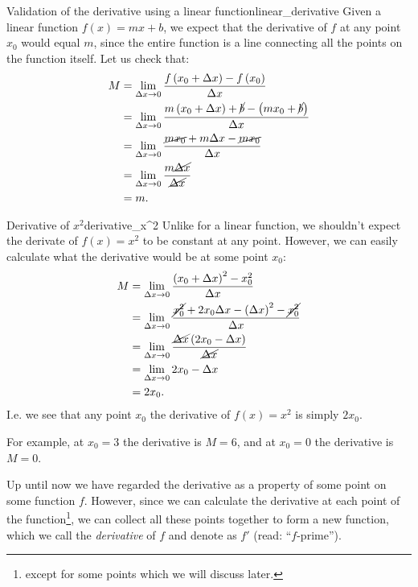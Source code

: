 \begin{example}{Validation of the derivative using a linear function}{linear_derivative}
  Given a linear function $f(x)=mx+b$, we expect that the derivative of $f$ at any point $x_{0}$ would equal $m$, since the entire function is a line connecting all the points on the function itself. Let us check that:
  \begin{align*}
    M &= \lim\limits_{\Delta x\to 0}\frac{f\left(x_{0}+\Delta x\right)-f\left(x_{0}\right)}{\Delta x}\\
      &= \lim\limits_{\Delta x\to 0}\frac{m\left(x_{0}+\Delta x\right)+\cancel{b}-\left(mx_{0}+\cancel{b}\right)}{\Delta x}\\
      &= \lim\limits_{\Delta x\to 0}\frac{\cancel{mx_{0}}+m\Delta x-\cancel{mx_{0}}}{\Delta x}\\
      &= \lim\limits_{\Delta x\to 0}\frac{m\cancel{\Delta x}}{\cancel{\Delta x}}\\
      &= m.
  \end{align*}
\end{example}

\begin{example}{Derivative of $x^{2}$}{derivative_x^2}
  Unlike for a linear function, we shouldn't expect the derivate of $f(x)=x^{2}$ to be constant at any point. However, we can easily calculate what the derivative would be at some point $x_{0}$:
  \begin{align*}
    M &= \lim\limits_{\Delta x\to 0}\frac{\left(x_{0}+\Delta x\right)^{2}-x_{0}^{2}}{\Delta x}\\
      &= \lim\limits_{\Delta x\to 0}\frac{\cancel{x_{0}^{2}}+2x_{0}\Delta x-\left(\Delta x\right)^{2}-\cancel{x_{0}^{2}}}{\Delta x}\\
      &= \lim\limits_{\Delta x\to 0}\frac{\cancel{\Delta x}\left(2x_{0}-\Delta x\right)}{\cancel{\Delta x}}\\
      &= \lim\limits_{\Delta x\to 0}2x_{0}-\Delta x\\
      &= 2x_{0}.
  \end{align*}
  I.e. we see that any point $x_{0}$ the derivative of $f(x)=x^{2}$ is simply $2x_{0}$.

  For example, at $x_{0}=3$ the derivative is $M=6$, and at $x_{0}=0$ the derivative is $M=0$.
\end{example}

Up until now we have regarded the derivative as a property of some point on some function $f$. However, since we can calculate the derivative at each point of the function\footnote{except for some points which we will discuss later.}, we can collect all these points together to form a new function, which we call the \emph{derivative} of $f$ and denote as $f'$ (read: ``$f$-prime'').

